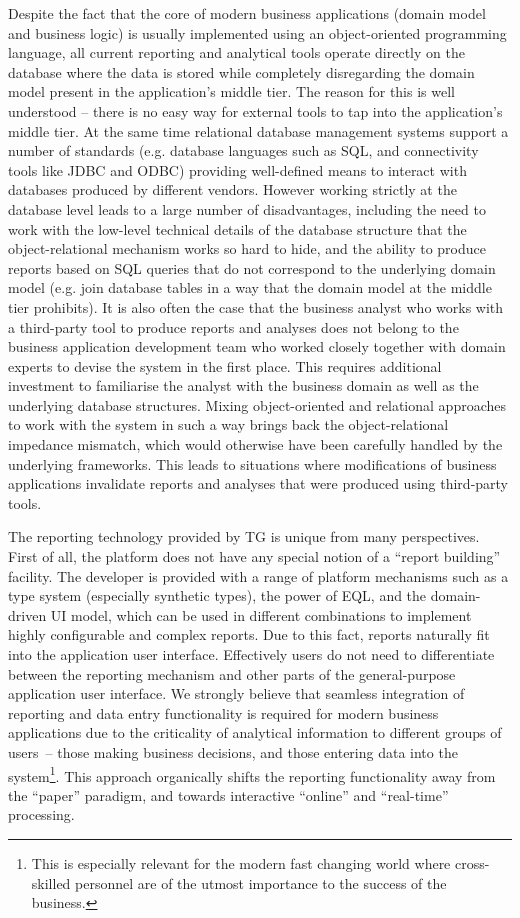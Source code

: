   Despite the fact that the core of modern business applications (domain model and business logic) is usually implemented using an object-oriented programming language, all current reporting and analytical tools operate directly on the database where the data is stored while completely disregarding the domain model present in the application's middle tier.  
  The reason for this is well understood -- there is no easy way for external tools to tap into the application's middle tier.
  At the same time relational database management systems support a number of standards (e.g. database languages such as SQL, and connectivity tools like JDBC and ODBC) providing well-defined means to interact with databases produced by different vendors.
  However working strictly at the database level leads to a large number of disadvantages, including the need to work with the low-level technical details of the database structure that the object-relational mechanism works so hard to hide, and the ability to produce reports based on SQL queries that do not correspond to the underlying domain model (e.g. join database tables in a way that the domain model at the middle tier prohibits).
  It is also often the case that the business analyst who works with a third-party tool to produce reports and analyses does not belong to the business application development team who worked closely together with domain experts to devise the system in the first place.
  This requires additional investment to familiarise the analyst with the business domain as well as the underlying database structures.
  Mixing object-oriented and relational approaches to work with the system in such a way brings back the object-relational impedance mismatch, which would otherwise have been carefully handled by the underlying frameworks.
  This leads to situations where modifications of business applications invalidate reports and analyses that were produced using third-party tools.

  The reporting technology provided by TG is unique from many perspectives.
  First of all, the platform does not have any special notion of a ``report building'' facility.
  The developer is provided with a range of platform mechanisms such as a type system (especially synthetic types), the power of EQL, and the domain-driven UI model, which can be used in different combinations to implement highly configurable and complex reports.
  Due to this fact, reports naturally fit into the application user interface.
  Effectively users do not need to differentiate between the reporting mechanism and other parts of the general-purpose application user interface.
  We strongly believe that seamless integration of reporting and data entry functionality is required for modern business applications due to the criticality of analytical information to different groups of users~-- those making business decisions, and those entering data into the system\footnote{This is especially relevant for the modern fast changing world where cross-skilled personnel are of the utmost importance to the success of the business.}.
  This approach organically shifts the reporting functionality away from  the ``paper'' paradigm, and towards interactive ``online'' and ``real-time'' processing.
  
